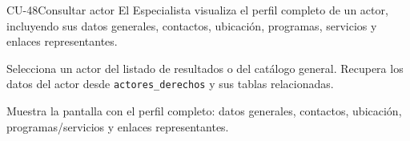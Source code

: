 \begin{UseCase}{CU-48}{Consultar actor}{
		El Especialista visualiza el perfil completo de un actor, incluyendo sus datos generales, contactos, ubicación, programas, servicios y enlaces representantes.
	}
{	}
\end{UseCase}
\begin{UCtrayectoria}
	\UCpaso[\UCactor] Selecciona un actor del listado de resultados o del catálogo general.
	\UCpaso Recupera los datos del actor desde \texttt{actores\_derechos} y sus tablas relacionadas. 
	
	\UCpaso Muestra la pantalla  con el perfil completo: datos generales, contactos, ubicación, programas/servicios y enlaces representantes.
	
	
\end{UCtrayectoria}

